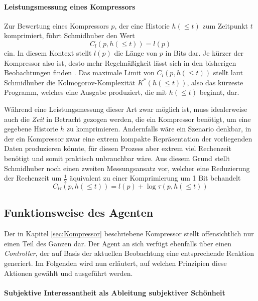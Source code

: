\paragraph{Leistungsmessung eines Kompressors}
Zur Bewertung eines Kompressors \(p\), der eine Historie \(h(\leq t)\) zum Zeitpunkt \(t\) komprimiert, führt Schmidhuber den Wert 
\begin{equation}
  C_l(p,h(\leq t)) = l(p)  
\end{equation}
ein. In diesem Kontext stellt \(l(p)\) die Länge von \(p\) in Bits dar. Je kürzer der Kompressor also ist, desto mehr Regelmäßigkeit lässt sich in den bisherigen Beobachtungen finden \cite[p.~19]{curiosity_schmidhuber}.
Das maximale Limit von \(C_l(p,h(\leq t))\) stellt laut Schmidhuber die Kolmogorov-Komplexität \(K^*(h(\leq t))\), also das kürzeste Programm, welches eine Ausgabe produziert, die mit \(h(\leq t)\) beginnt, dar.

Während eine Leistungsmessung dieser Art zwar möglich ist, muss idealerweise auch die \emph{Zeit} in Betracht gezogen werden, die ein Kompressor benötigt, um eine gegebene Historie \(h\) zu komprimieren. Andernfalls wäre ein Szenario denkbar, in der ein Kompressor zwar eine extrem kompakte Repräsentation der vorliegenden Daten produzieren könnte, für diesen Prozess aber extrem viel Rechenzeit benötigt und somit praktisch unbrauchbar wäre.
Aus diesem Grund stellt Schmidhuber noch einen zweiten Messungsansatz vor, welcher eine Reduzierung der Rechenzeit um \(\frac{1}{2}\) äquivalent zu einer Komprimierung um 1 Bit behandelt \cite[p.~19]{curiosity_schmidhuber}
\begin{equation}
  C_{l\tau}(p,h(\leq t)) = l(p) + \log \tau(p, h(\leq t)) 
\end{equation}


\subsection{Funktionsweise des Agenten}
Der in Kapitel \ref{sec:Kompressor} beschriebene Kompressor stellt offensichtlich nur einen Teil des Ganzen dar. Der Agent an sich verfügt ebenfalls über einen \emph{Controller}, der auf Basis der aktuellen Beobachtung eine entsprechende Reaktion generiert.
Im Folgenden wird nun erläutert, auf welchen Prinzipien diese Aktionen gewählt und ausgeführt werden.

\paragraph{Subjektive Interessantheit als Ableitung subjektiver Schönheit}
\label{sec:Beauty_und_Curiosity}

